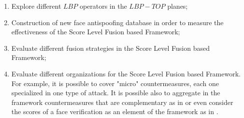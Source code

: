 \begin{enumerate}
	\item Explore different $LBP$ operators in the $LBP-TOP$ planes;
	\item Construction of new face antispoofing database in order to measure the effectiveness of the Score Level Fusion based Framework;
	\item Evaluate different fusion strategies in the Score Level Fusion based Framework;
	\item Evaluate different organizations for the Score Level Fusion based Framework. For example, it is possible to cover "micro" countermeasures, each one specialized in one type of attack. It is possible also to aggregate in the framework countermeasures that are complementary as in \cite{Komulainen_ICB_2013} or even consider the scores of a face verification as an element of the framework as in \cite{Chingovska_CVPRWORKSHOPONBIOMETRICS_2013}.

\end{enumerate}
